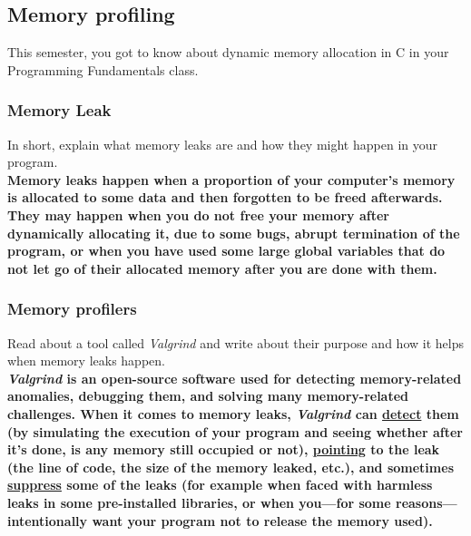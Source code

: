 \documentclass[titlepage, 12pt]{article}
\begin{document}
	\subsection{Memory profiling}
	This semester, you got to know about dynamic memory allocation in C in your Programming
	Fundamentals class.
	\subsubsection{Memory Leak}
	In short, explain what memory leaks are and how they might happen in your program.
	\\
	\textbf{Memory leaks happen when a proportion of your computer's memory is allocated to some data and then forgotten to be freed afterwards. They may happen when you do not free your memory after dynamically allocating it, due to some bugs, abrupt termination of the program, or when you have used some large global variables that do not let go of their allocated memory after you are done with them.}
	
	\subsubsection{Memory profilers}
	Read about a tool called \textit{Valgrind} and write about their purpose and how it helps when memory leaks happen.
	\\
	\textbf{\textit{Valgrind} is an open-source software used for detecting memory-related anomalies, debugging them, and solving many memory-related challenges. When it comes to memory leaks, \textit{Valgrind} can \underline{detect} them (by simulating the execution of your program and seeing whether after it's done, is any memory still occupied or not), \underline{pointing} to the leak (the line of code, the size of the memory leaked, etc.), and sometimes \underline{suppress} some of the leaks (for example when faced with harmless leaks in some pre-installed libraries, or when you---for some reasons---intentionally want your program not to release the memory used).}
\end{document}

